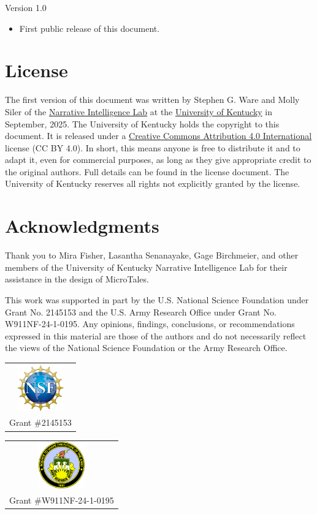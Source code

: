 \documentclass{nilreport}
\begin{document}
Version 1.0
\begin{itemize}
	\item First public release of this document.
\end{itemize}

\section{License}

The first version of this document was written by Stephen G. Ware and Molly Siler of the \href{http://cs.uky.edu/~sgware}{Narrative Intelligence Lab} at the \href{http://cs.uky.edu}{University of Kentucky} in September, 2025. The University of Kentucky holds the copyright to this document. It is released under a \href{https://creativecommons.org/licenses/by/4.0/deed.en}{Creative Commons Attribution 4.0 International} license (CC BY 4.0). In short, this means anyone is free to distribute it and to adapt it, even for commercial purposes, as long as they give appropriate credit to the original authors. Full details can be found in the license document. The University of Kentucky reserves all rights not explicitly granted by the license.

\section{Acknowledgments}

Thank you to Mira Fisher, Lasantha Senanayake, Gage Birchmeier, and other members of the University of Kentucky Narrative Intelligence Lab for their assistance in the design of MicroTales.

This work was supported in part by the U.S. National Science Foundation under Grant No. 2145153 and the U.S. Army Research Office under Grant No. W911NF-24-1-0195. Any opinions, findings, conclusions, or recommendations expressed in this material are those of the authors and do not necessarily reflect the views of the National Science Foundation or the Army Research Office.

\begin{center}
\begin{tabular}{c}
\includegraphics[width=2cm]{images/nsflogo.png}\tabularnewline
Grant \#2145153\tabularnewline
\end{tabular}\quad{}%
\begin{tabular}{c}
\includegraphics[width=2cm]{images/arologo.png}\tabularnewline
Grant \#W911NF-24-1-0195\tabularnewline
\end{tabular}
\par\end{center}




\end{document}
